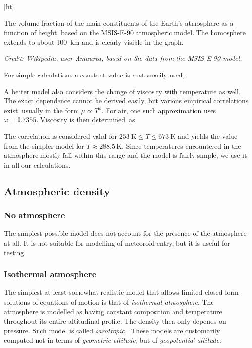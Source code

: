             [ht]{
                The volume fraction of the main constituents of the Earth's atmosphere
                as a function of height, based on the MSIS-E-90 atmospheric model.
                The homosphere extends to about \SI{100}{\kilo\metre} and is clearly visible
                in the graph.

                \textit{Credit: Wikipedia, user Amaurea, based on the data from the MSIS-E-90 model.}
            }

            For simple calculations a constant value is customarily used,

            A better model also considers the change of viscosity with temperature as well.
            The exact dependence cannot be derived easily, but various empirical correlations
            exist, usually in the form $\mu \propto T^\omega$.
            For air, one such approximation \citep{tec-science-viscosity}
            uses $\omega = \num{0.7355}$. Viscosity is then determined~as

            The correlation is considered valid for $\SI{253}{\kelvin} \leq T \leq \SI{673}{\kelvin}$
            and yields the value from the simpler model for $T \approx \SI{288.5}{\kelvin}$.
            Since temperatures encountered in the atmosphere mostly fall within this range
            and the model is fairly simple, we use it in all our calculations.

    \subsection{Atmospheric density} \label{fdd}

        \subsubsection{No atmosphere} \label{fddn}
            The simplest possible model does not account for the presence of the atmosphere at all.
            It is not suitable for modelling of meteoroid entry, but it is useful for testing.

        \subsubsection{Isothermal atmosphere} \label{fddt}
            The simplest at least somewhat realistic model that allows limited closed-form
            solutions of equations of motion is that of \emph{isothermal atmosphere}.
            The atmosphere is modelled as having constant composition and temperature
            throughout its entire altitudinal profile. The density then only depends on pressure.
            Such model is called \textit{barotropic} \citep{shames1992}.
            These models are customarily computed not in terms of \textit{geometric altitude},
            but of \textit{geopotential altitude}.

